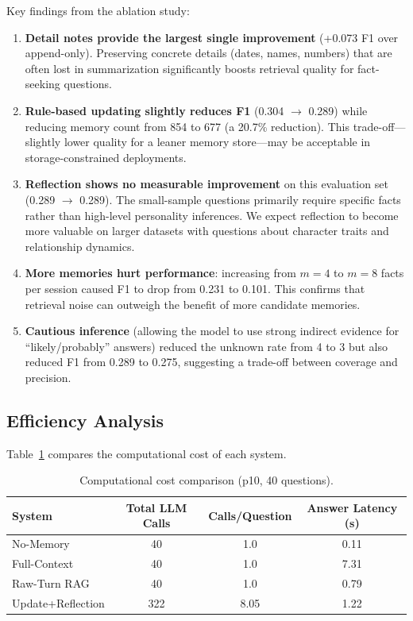 \documentclass[11pt]{article}
\begin{document}
Key findings from the ablation study:

\begin{enumerate}
    \item \textbf{Detail notes provide the largest single improvement} (+0.073 F1 over append-only). Preserving concrete details (dates, names, numbers) that are often lost in summarization significantly boosts retrieval quality for fact-seeking questions.
    \item \textbf{Rule-based updating slightly reduces F1} (0.304 $\rightarrow$ 0.289) while reducing memory count from 854 to 677 (a 20.7\% reduction). This trade-off---slightly lower quality for a leaner memory store---may be acceptable in storage-constrained deployments.
    \item \textbf{Reflection shows no measurable improvement} on this evaluation set (0.289 $\rightarrow$ 0.289). The small-sample questions primarily require specific facts rather than high-level personality inferences. We expect reflection to become more valuable on larger datasets with questions about character traits and relationship dynamics.
    \item \textbf{More memories hurt performance}: increasing from $m=4$ to $m=8$ facts per session caused F1 to drop from 0.231 to 0.101. This confirms that retrieval noise can outweigh the benefit of more candidate memories.
    \item \textbf{Cautious inference} (allowing the model to use strong indirect evidence for ``likely/probably'' answers) reduced the unknown rate from 4 to 3 but also reduced F1 from 0.289 to 0.275, suggesting a trade-off between coverage and precision.
\end{enumerate}

\subsection{Efficiency Analysis}

Table~\ref{tab:efficiency} compares the computational cost of each system.

\begin{table}[t]
\centering
\small
\begin{tabular}{lccc}
\toprule
\textbf{System} & \textbf{Total LLM Calls} & \textbf{Calls/Question} & \textbf{Answer Latency (s)} \\
\midrule
No-Memory      & 40  & 1.0  & 0.11 \\
Full-Context   & 40  & 1.0  & 7.31 \\
Raw-Turn RAG   & 40  & 1.0  & 0.79 \\
Update+Reflection & 322 & 8.05 & 1.22 \\
\bottomrule
\end{tabular}
\caption{Computational cost comparison (p10, 40 questions).}
\label{tab:efficiency}
\end{table}
\end{document}
